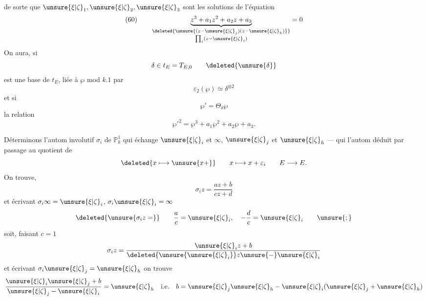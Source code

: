 
de sorte que $\unsure{\xi|\zeta}_1,\unsure{\xi|\zeta}_2,\unsure{\xi|\zeta}_3$ sont les solutions de l'équation
\[
(60)\qquad\underbrace{z^3+a_1z^2+a_2z+a_3}_{
\substack{\deleted{\unsure{(z-\unsure{\xi|\zeta}_j)(z-\unsure{\xi|\zeta}_h)}}\\\prod_i(z-\unsure{\xi|\zeta}_i)}}=0
\]
On aura,  si
\[
\delta\in t_E=T_{E,0}\qquad\deleted{\unsure{\delta}}
\]
est une base de $t_E$, liée à $\wp$ mod $k.1$ par
\[
\varepsilon_2(\wp)\simeq\delta^{\otimes2}
\]
et si
\[
\wp'=\Theta_\delta\wp
\]
la relation
\[
\wp'^2=\wp^3+a_1\wp^2+a_2\wp+a_3.
\]

Déterminons l'autom involutif $\sigma_i$ de $\mathbb P^1_k$ qui échange
$\unsure{\xi|\zeta}_i$ et $\infty$, $\unsure{\xi|\zeta}_j$ et $\unsure{\xi|\zeta}_h$ --- qui 
 l'autom déduit par passage au quotient de
\[
\deleted{x\longmapsto\unsure{x+}}\qquad x\longmapsto x+\varepsilon_i\qquad E\longrightarrow E.
\]
On trouve, 
\[
\sigma_i z=\frac{az+b}{cz+d}
\]
et écrivant $\sigma_i\infty=\unsure{\xi|\zeta}_i$, $\sigma_i\unsure{\xi|\zeta}_i=\infty$
\[
\deleted{\unsure{\sigma_i z=}}\qquad\frac ac=\unsure{\xi|\zeta}_i,\quad-\frac dc=\unsure{\xi|\zeta}_i\qquad\unsure{;} 
\]
soit, faisant $c=1$
\[
\sigma_i z=\frac{\unsure{\xi|\zeta}_i z+b}{\deleted{\unsure{\unsure{\xi|\zeta}_i}}z\unsure{-}\unsure{\xi|\zeta}_i}
\]
et écrivant $\sigma_i\unsure{\xi|\zeta}_j=\unsure{\xi|\zeta}_h$ on trouve
\[
\frac{\unsure{\xi|\zeta}_i\unsure{\xi|\zeta}_j+b}{\unsure{\xi|\zeta}_j-\unsure{\xi|\zeta}_i}=\unsure{\xi|\zeta}_h\quad\text{i.e.}\quad
b=\unsure{\xi|\zeta}_j\unsure{\xi|\zeta}_h-\unsure{\xi|\zeta}_i(\unsure{\xi|\zeta}_j+\unsure{\xi|\zeta}_h)
\]
